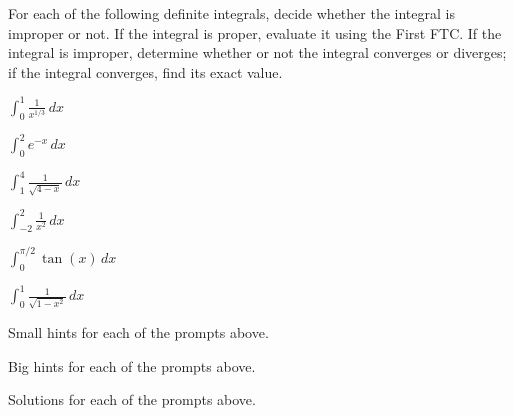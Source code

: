 \begin{activity} \label{A:6.5.3}  For each of the following definite integrals, decide whether the integral is improper or not.  If the integral is proper, evaluate it using the First FTC.  If the integral is improper, determine whether or not the integral converges or diverges; if the integral converges, find its exact value. 
\ba
	\item $\int_0^1 \frac{1}{x^{1/3}} \, dx$
	\item $\int_0^2 e^{-x} \, dx$
	\item $\int_1^4 \frac{1}{\sqrt{4-x}} \, dx$
	\item $\int_{-2}^2 \frac{1}{x^2} \, dx$
	\item $\int_0^{\pi/2} \tan(x) \, dx$
	\item $\int_0^1 \frac{1}{\sqrt{1-x^2}} \, dx$
\ea

\end{activity}
\begin{smallhint}
\ba
	\item Small hints for each of the prompts above.
\ea
\end{smallhint}
\begin{bighint}
\ba
	\item Big hints for each of the prompts above.
\ea
\end{bighint}
\begin{activitySolution}
\ba
	\item Solutions for each of the prompts above.
\ea
\end{activitySolution}
\aftera